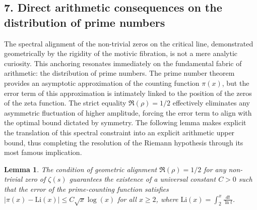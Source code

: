 \documentclass[
]{article}
\newtheorem{lemma}{Lemma}
\begin{document}
\hypertarget{direct-arithmetic-consequences-on-the-distribution-of-prime-numbers}{%
\subsection{7. Direct arithmetic consequences on the distribution of prime numbers}\label{direct-arithmetic-consequences-on-the-distribution-of-prime-numbers}}

The spectral alignment of the non-trivial zeros on the critical line, demonstrated geometrically by the rigidity of the motivic fibration, is not a mere analytic curiosity. This anchoring resonates immediately on the fundamental fabric of arithmetic: the distribution of prime numbers. The prime number theorem provides an asymptotic approximation of the counting function $\pi(x)$, but the error term of this approximation is intimately linked to the position of the zeros of the zeta function. The strict equality $\Re(\rho) = 1/2$ effectively eliminates any asymmetric fluctuation of higher amplitude, forcing the error term to align with the optimal bound dictated by symmetry. The following lemma makes explicit the translation of this spectral constraint into an explicit arithmetic upper bound, thus completing the resolution of the Riemann hypothesis through its most famous implication.

\begin{lemma}
The condition of geometric alignment $\Re(\rho) = 1/2$ for any non-trivial zero of $\zeta(s)$ guarantees the existence of a universal constant $C > 0$ such that the error of the prime-counting function satisfies $\left| \pi(x) - \mathrm{Li}(x) \right| \le C \sqrt{x} \log(x)$ for all $x \ge 2$, where $\mathrm{Li}(x) = \int_2^x \frac{dt}{\ln t}$.
\end{lemma}
\end{document}
